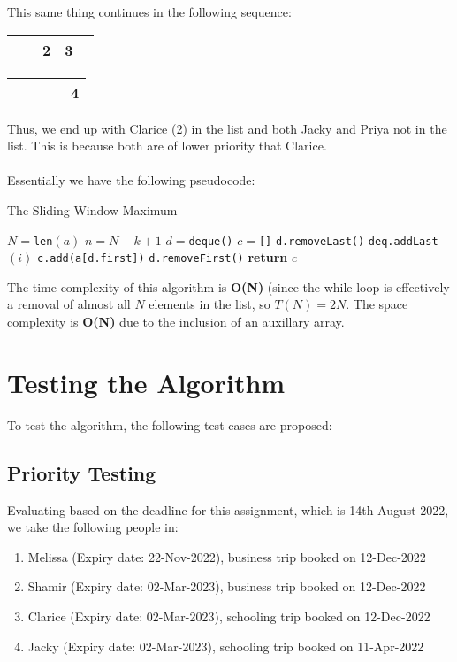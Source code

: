 \documentclass{article}
\newcommand{\arraySpaceFive}[5]{%
\begin{center}%
\begin{tabular}{|c|c|c|c|c|}%
\hline #1 & #2 & #3 & #4 & #5 \\ \hline %
\end{tabular} %
\end{center} %
}
\begin{document}
This same thing continues in the following sequence:
\arraySpaceFive{}{}{2}{3}{}
\arraySpaceFive{}{}{}{}{4}

Thus, we end up with Clarice (2) in the list and both Jacky and Priya not in the list. This is because both are of lower priority that Clarice.
\\\\
Essentially we have the following pseudocode:
\begin{algorithm}[H]
\caption{The Sliding Window Maximum}
\label{alg:studentmodel}
\begin{algorithmic}[1]
     
        \State $N = $\texttt{len}$(a)$
        \State $n = N - k + 1$
        \State $d = $\texttt{deque()}
        \State $c = $\texttt{[]}
            \State \texttt{d.removeLast()}
        \EndWhile
        \State \texttt{deq.addLast}$(i)$
            \State \texttt{c.add(a[d.first])}
        \EndIf
        \State \texttt{d.removeFirst()}
        \EndIf
        \EndIf
        \EndFor
        \State \textbf{return} $c$
    \EndProcedure
\end{algorithmic}
\end{algorithm}

The time complexity of this algorithm is \textbf{O(N)} (since the while loop is effectively a removal of almost all $N$ elements in the list, so $T(N) = 2N$. The space complexity is \textbf{O(N)} due to the inclusion of an auxillary array.

\section{Testing the Algorithm}
To test the algorithm, the following test cases are proposed:

\subsection{Priority Testing}

Evaluating based on the deadline for this assignment, which is 14th August 2022, we take the following people in:
\begin{enumerate}
    \item Melissa (Expiry date: 22-Nov-2022), business trip booked on 12-Dec-2022
    \item Shamir (Expiry date: 02-Mar-2023), business trip booked on 12-Dec-2022
    \item Clarice (Expiry date: 02-Mar-2023), schooling trip booked on 12-Dec-2022
    \item Jacky (Expiry date: 02-Mar-2023), schooling trip booked on 11-Apr-2022
\end{enumerate} 
\end{document}
